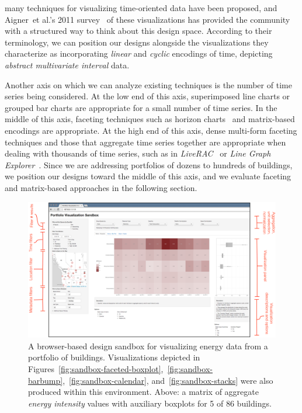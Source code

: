 \documentclass[journal]{vgtc}                %
\newcommand{\bstart}[1]{\vspace{1mm} \noindent{\textbf{#1:}}}
\newcommand{\etal}{et al.}
\begin{document}
\bstart{Visualizing multiple time series} many techniques for visualizing time-oriented data have been proposed, and Aigner~\etal's 2011 survey~\cite{Aigner2011} of these visualizations has provided the community with a structured way to think about this design space.
According to their terminology, we can position our designs alongside the visualizations they characterize as incorporating {\it linear} and {\it cyclic} encodings of time, depicting {\it abstract multivariate interval} data.

Another axis on which we can analyze existing techniques is the number of time series being considered.
At the low end of this axis, superimposed line charts or grouped bar charts are appropriate for a small number of time series. 
In the middle of this axis, faceting techniques such as horizon charts~\cite{Heer2009} and matrix-based encodings are appropriate.
At the high end of this axis, dense multi-form faceting techniques and those that aggregate time series together are appropriate when dealing with thousands of time series, such as in {\it LiveRAC}~\cite{McLachlan2008} or {\it Line Graph Explorer}~\cite{Lam2007}. 
Since we are addressing portfolios of dozens to hundreds of buildings, we position our designs toward the middle of this axis, and we evaluate faceting and matrix-based approaches in the following section.

\begin{figure}[hbp!]
    \vspace{-0.3cm}
	\centering
	\includegraphics[width=\textwidth]{figures/sandbox.pdf}
	\vspace{-0.6cm}
	\caption{A browser-based design sandbox for visualizing energy data from a portfolio of buildings. Visualizations depicted in Figures~\ref{fig:sandbox-faceted-boxplot},~\ref{fig:sandbox-barbump},~\ref{fig:sandbox-calendar}, and~\ref{fig:sandbox-stacks} were also produced within this environment. Above: a matrix of aggregate \textsl{energy intensity} values with auxiliary boxplots for 5 of 86 buildings.}
	\label{fig:sandbox}
\end{figure} 
\end{document}

